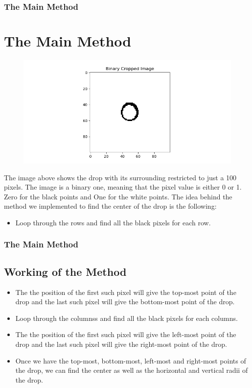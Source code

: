 \documentclass{beamer}
\begin{document}
\begin{frame}
    \frametitle{The Main Method}
    \section{The Main Method}
    \begin{figure}
        \centering
        \includegraphics[scale=0.4]{small.png}
    \end{figure}
    The image above shows the drop with its surrounding restricted to just a 100 pixels. The image is a binary one, meaning that the pixel value is either 0 or 1. Zero for the black points and One for the white points. The idea behind the method we implemented to find the center of the drop is the following:
    \begin{itemize}
        \item <2-> Loop through the rows and find all the black pixels for each row.
    \end{itemize}
\end{frame}
\begin{frame}
    \frametitle{The Main Method}
    \subsection{Working of the Method}
    \begin{itemize}
        \item <1-> The the position of the first such pixel will give the top-most point of the drop and the last such pixel will give the bottom-most point of the drop.
        \item <2-> Loop through the columnss and find all the black pixels for each columns.
        \item <3-> The the position of the first such pixel will give the left-most point of the drop and the last such pixel will give the right-most point of the drop.
        \item <4-> Once we have the top-most, bottom-most, left-most and right-most points of the drop, we can find the center as well as the horizontal and vertical radii of the drop.
    \end{itemize}
\end{frame}
\end{document}
